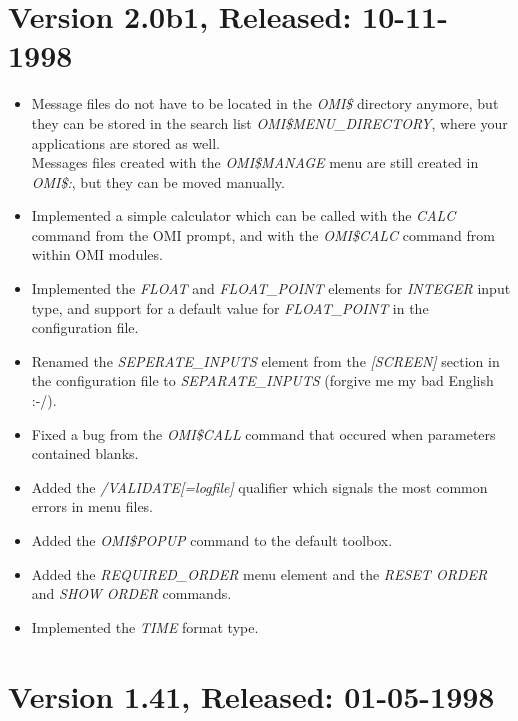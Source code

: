 \documentclass[a4paper]{book}
\begin{document}
\section*{Version 2.0b1, Released: 10-11-1998}

\begin{itemize}
\item Message files do not have to be located in the \textsl{OMI{\$}} directory anymore, but they can be stored in the search list \textsl{OMI{\$}MENU{\_}DIRECTORY}, where your applications are stored as well.\\
Messages files created with the \textsl{OMI{\$}MANAGE} menu are still created in \textsl{OMI{\$}:}, but they can be moved manually.
\item Implemented a simple calculator which can be called with the \textsl{CALC} command from the OMI prompt, and with the \textsl{OMI{\$}CALC} command from within OMI modules.
\item Implemented the \textsl{FLOAT} and \textsl{FLOAT{\_}POINT} elements for \textsl{INTEGER} input type, and support for a default value for \textsl{FLOAT{\_}POINT} in the configuration file.
\item Renamed the \textsl{SEPERATE{\_}INPUTS} element from the \textsl{[SCREEN]} section in the configuration file to \textsl{SEPARATE{\_}INPUTS} (forgive me my bad English :-/).
\item Fixed a bug from the \textsl{OMI{\$}CALL} command that occured when parameters contained blanks.
\item Added the \textsl{/VALIDATE[=logfile]} qualifier which signals the most common errors in menu files.
\item Added the \textsl{OMI{\$}POPUP} command to the default toolbox.
\item Added the \textsl{REQUIRED{\_}ORDER} menu element and the \textsl{RESET ORDER} and  \textsl{SHOW ORDER} commands.
\item Implemented the \textsl{TIME} format type.
\end{itemize}

\section*{Version 1.41, Released: 01-05-1998}
\end{document}
